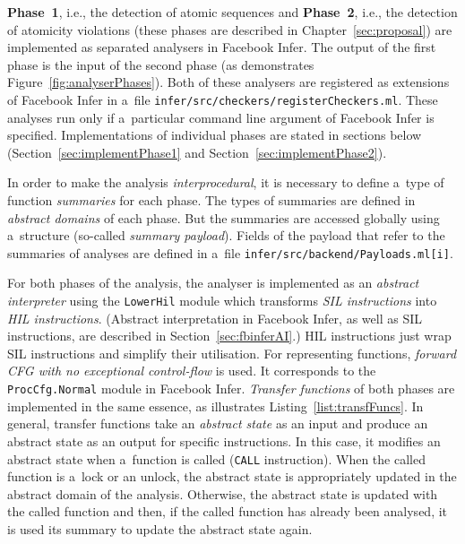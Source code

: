 \textbf{Phase~1}, i.e., the detection of atomic sequences and \textbf{Phase~2},
i.e., the detection of atomicity violations (these phases are described
in Chapter~\ref{sec:proposal}) are implemented as separated analysers
in Facebook Infer. The output of the first phase is the input of
the second phase (as demonstrates Figure~\ref{fig:analyserPhases}). Both of
these analysers are registered as extensions of Facebook Infer in a~file
\texttt{infer/src/checkers/registerCheckers.ml}. These analyses run only
if a~particular command line argument of Facebook Infer is specified.
Implementations of individual phases are stated in sections below
(Section~\ref{sec:implementPhase1} and Section~\ref{sec:implementPhase2}).

In order to make the analysis \emph{interprocedural}, it is necessary to
define a~type of function \emph{summaries} for each phase.
The types of summaries are defined in \emph{abstract domains} of
each phase. But the summaries are accessed globally using a~structure
(so-called \emph{summary payload}). Fields of the payload that refer to
the summaries of analyses are defined in a~file
\texttt{infer/src/backend/Payloads.ml[i]}.

For both phases of the analysis, the analyser is implemented as an
\emph{abstract interpreter} using the \texttt{LowerHil} module which
transforms \emph{SIL instructions} into \emph{HIL instructions}.
(Abstract interpretation in Facebook Infer, as well as SIL instructions,
are described in Section~\ref{sec:fbinferAI}.) HIL instructions
just wrap SIL instructions and simplify their utilisation. For
representing functions, \emph{forward CFG with no exceptional
control-flow} is used. It corresponds to the \texttt{ProcCfg.Normal}
module in Facebook Infer. \emph{Transfer functions} of both phases
are implemented in the same essence, as illustrates
Listing~\ref{list:transfFuncs}. In general, transfer functions
take an \emph{abstract state} as an input and produce an abstract state
as an output for specific instructions. In this case, it modifies an
abstract state when a~function is called (\texttt{CALL} instruction).
When the called function is a~lock or an unlock, the abstract state is
appropriately updated in the abstract domain of the analysis. Otherwise,
the abstract state is updated with the called function and then, if
the called function has already been analysed, it is used its summary
to update the abstract state again.

